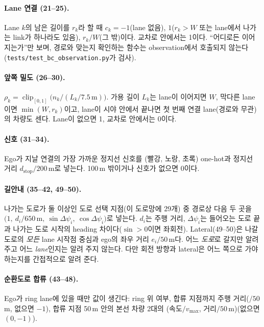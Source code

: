 \documentclass[10pt,a4paper]{article}
\newcommand{\vmax}{v_{\max}}
\begin{document}
\paragraph{Lane 연결 (21--25).} Lane $k$의 남은 길이를 $r_k$라 할 때 $c_k = -1$(lane 없음), $1$($r_k > W$ 또는 lane에서 나가는 link가 하나라도 있음), $r_k/W$(그 밖)이다. 교차로 안에서는 1이다. ``어디로든 이어지는가''만 보며, 경로와 맞는지 확인하는 함수는 observation에서 호출되지 않는다(\texttt{tests/test\_bc\_observation.py}가 검사).

\paragraph{앞쪽 밀도 (26--30).} $\rho_k = \operatorname{clip}_{[0,1]}\big(n_k / (L_k/7.5\,\mathrm{m})\big)$. 가용 길이 $L_k$는 lane이 이어지면 $W$, 막다른 lane이면 $\min(W, r_k)$이고, lane이 시야 안에서 끝나면 첫 번째 연결 lane(경로와 무관)의 차량도 센다. Lane이 없으면 1, 교차로 안에서는 0이다.

\paragraph{신호 (31--34).} Ego가 지날 연결의 가장 가까운 정지선 신호를 (빨강, 노랑, 초록) one-hot과 정지선 거리 $d_{\mathrm{stop}}/200$\,m로 넣는다. 100\,m 밖이거나 신호가 없으면 0이다.

\paragraph{길안내 (35--42, 49--50).} 나가는 도로가 둘 이상인 도로 선택 지점(이 도로망에 29개) 중 경로상 다음 두 곳을 $\big(1,\ d_i/650\,\mathrm{m},\ \sin\Delta\psi_i,\ \cos\Delta\psi_i\big)$로 넣는다. $d_i$는 주행 거리, $\Delta\psi_i$는 들어오는 도로 끝과 나가는 도로 시작의 heading 차이다($\sin>0$이면 좌회전). Lateral(49--50)은 나갈 도로의 \emph{모든} lane 시작점 중심과 ego의 좌우 거리 $e_i/50$\,m다. 어느 \emph{도로}로 갈지만 알려 주고 어느 \emph{lane}인지는 알려 주지 않는다. 다만 회전 방향과 lateral은 어느 쪽으로 가야 하는지를 간접적으로 알려 준다.

\paragraph{순환도로 합류 (43--48).} Ego가 ring lane에 있을 때만 값이 생긴다: ring 위 여부, 합류 지점까지 주행 거리($/50$\,m, 없으면 $-1$), 합류 지점 50\,m 안의 본선 차량 2대의 (속도$/\vmax$, 거리$/50$\,m)(없으면 $(0,-1)$).
\end{document}
